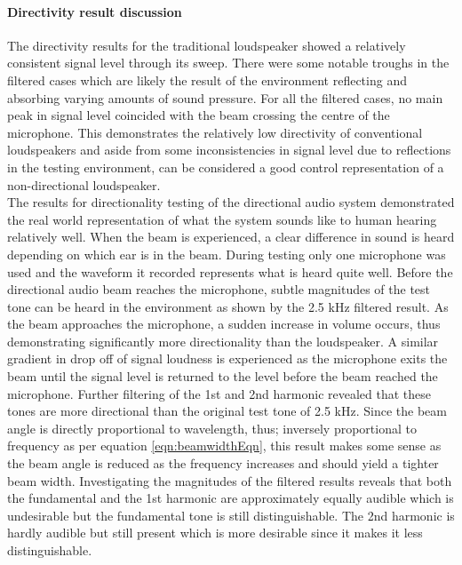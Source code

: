 \paragraph{Directivity result discussion}
The directivity results for the traditional loudspeaker showed a relatively consistent signal level through its sweep. There were some notable troughs in the filtered cases which are likely the result of the environment reflecting and absorbing varying amounts of sound pressure. For all the filtered cases, no main peak in signal level coincided with the beam crossing the centre of the microphone. This demonstrates the relatively low directivity of conventional loudspeakers and aside from some inconsistencies in signal level due to reflections in the testing environment, can be considered a good control representation of a non-directional loudspeaker.\\
The results for directionality testing of the directional audio system demonstrated the real world representation of what the system sounds like to human hearing relatively well. When the beam is experienced, a clear difference in sound is heard depending on which ear is in the beam. During testing only one microphone was used and the waveform it recorded represents what is heard quite well. Before the directional audio beam reaches the microphone, subtle magnitudes of the test tone can be heard in the environment as shown by the 2.5 kHz filtered result. As the beam approaches the microphone, a sudden increase in volume occurs, thus demonstrating significantly more directionality than the loudspeaker. A similar gradient in drop off of signal loudness is experienced as the microphone exits the beam until the signal level is returned to the level before the beam reached the microphone. Further filtering of the 1st and 2nd harmonic revealed that these tones are more directional than the original test tone of 2.5 kHz. Since the beam angle is directly proportional to wavelength, thus; inversely proportional to frequency as per equation \ref{eqn:beamwidthEqn}, this result makes some sense as the beam angle is reduced as the frequency increases and should yield a tighter beam width. Investigating the magnitudes of the filtered results reveals that both the fundamental and the 1st harmonic are approximately equally audible which is undesirable but the fundamental tone is still distinguishable. The 2nd harmonic is hardly audible but still present which is more desirable since it makes it less distinguishable.

